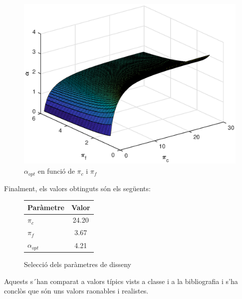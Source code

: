 \begin{itemize}
\begin{figure}[H]
	\includegraphics[scale=0.6]{./pics/alpha_pc_pf}
	\caption{$\alpha_{opt}$ en funció de $\pi_c$ i $\pi_f$}
\end{figure}
\end{itemize}
Finalment, els valors obtinguts són els següents:
\begin{figure}[H]
	\centering
	\begin{tabular}{lc}
		\toprule[3pt]
		\textbf{Paràmetre}&\textbf{Valor}\\
		\midrule[1pt]
		$\pi_{c}$ & 24.20 \\
		$\pi_{f}$ & 3.67 \\
		$\alpha_{opt}$ & 4.21 \\
		\bottomrule[2pt]
	\end{tabular}
	\label{C_opti2}
	\caption{Selecció dels paràmetres de disseny}
\end{figure}
Aquests s´han comparat a valors típics vists a classe i a la bibliografia i s'ha conclòs que són uns valors raonables i realistes.

